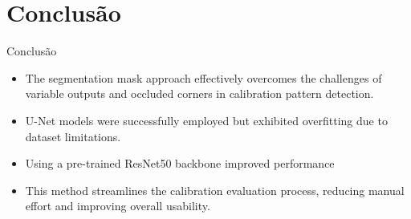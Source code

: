 \section{Conclusão}
\begin{frame}{Conclusão}


      \begin{itemize}
      \Large
      \item<1-> The segmentation mask approach effectively overcomes the challenges of variable
        outputs and occluded corners in calibration pattern detection.
      \item<2-> U-Net models were successfully employed but exhibited overfitting due to dataset limitations.
      \item<3-> Using a pre-trained ResNet50 backbone improved performance%
      \item<4->  This method streamlines the calibration
evaluation process, reducing manual effort and improving overall usability. 
      \end{itemize}


\end{frame}

\maketitle
